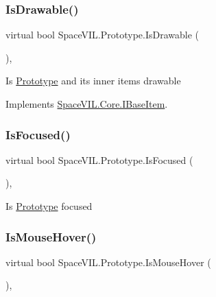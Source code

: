 \subsubsection{\texorpdfstring{Is\+Drawable()}{IsDrawable()}}
{\footnotesize\ttfamily virtual bool Space\+V\+I\+L.\+Prototype.\+Is\+Drawable (\begin{DoxyParamCaption}{ }\end{DoxyParamCaption})\hspace{0.3cm}{\ttfamily [inline]}, {\ttfamily [virtual]}}



Is \mbox{\hyperlink{class_space_v_i_l_1_1_prototype}{Prototype}} and its inner items drawable 



Implements \mbox{\hyperlink{interface_space_v_i_l_1_1_core_1_1_i_base_item}{Space\+V\+I\+L.\+Core.\+I\+Base\+Item}}.

\mbox{\label{class_space_v_i_l_1_1_prototype_aa89bae9f05c9cfce9c1dda5231b3b321}} 
\subsubsection{\texorpdfstring{Is\+Focused()}{IsFocused()}}
{\footnotesize\ttfamily virtual bool Space\+V\+I\+L.\+Prototype.\+Is\+Focused (\begin{DoxyParamCaption}{ }\end{DoxyParamCaption})\hspace{0.3cm}{\ttfamily [inline]}, {\ttfamily [virtual]}}



Is \mbox{\hyperlink{class_space_v_i_l_1_1_prototype}{Prototype}} focused 

\mbox{\label{class_space_v_i_l_1_1_prototype_a6b8dcf54d97cc24aa7ef347bd33f8664}} 
\subsubsection{\texorpdfstring{Is\+Mouse\+Hover()}{IsMouseHover()}}
{\footnotesize\ttfamily virtual bool Space\+V\+I\+L.\+Prototype.\+Is\+Mouse\+Hover (\begin{DoxyParamCaption}{ }\end{DoxyParamCaption})\hspace{0.3cm}{\ttfamily [inline]}, {\ttfamily [virtual]}}



